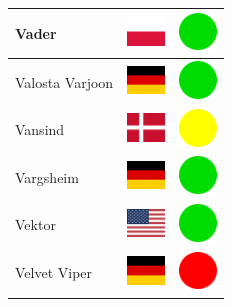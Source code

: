 \documentclass[12pt, a4paper, twoside]{report}
\begin{document}
\begin{center}
\begin{longtable}{|p{5cm}|p{2cm}|p{2cm}|}
 Vader                                                      & \includegraphics[width=1cm]{../4x3/pl} &   \includegraphics[width=1cm]{../likes/y} \\ \hline
 Valosta Varjoon                                            & \includegraphics[width=1cm]{../4x3/de} &   \includegraphics[width=1cm]{../likes/y} \\ \hline
 Vansind                                                    & \includegraphics[width=1cm]{../4x3/dk} &   \includegraphics[width=1cm]{../likes/m} \\ \hline
 Vargsheim                                                  & \includegraphics[width=1cm]{../4x3/de} &   \includegraphics[width=1cm]{../likes/y} \\ \hline
 Vektor                                                     & \includegraphics[width=1cm]{../4x3/us} &   \includegraphics[width=1cm]{../likes/y} \\ \hline
 Velvet Viper                                               & \includegraphics[width=1cm]{../4x3/de} &   \includegraphics[width=1cm]{../likes/n} \\ \hline

\end{longtable}
\end{center}
\end{document}
